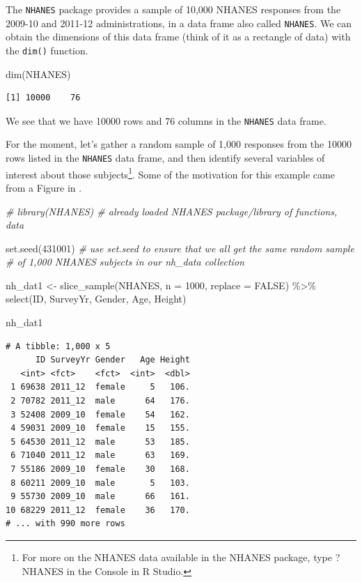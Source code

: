 \documentclass[
]{book}
\newenvironment{Shaded}{\begin{snugshade}}{\end{snugshade}}
\newcommand{\AttributeTok}[1]{\textcolor[rgb]{0.77,0.63,0.00}{#1}}
\newcommand{\CommentTok}[1]{\textcolor[rgb]{0.56,0.35,0.01}{\textit{#1}}}
\newcommand{\ConstantTok}[1]{\textcolor[rgb]{0.00,0.00,0.00}{#1}}
\newcommand{\DecValTok}[1]{\textcolor[rgb]{0.00,0.00,0.81}{#1}}
\newcommand{\FunctionTok}[1]{\textcolor[rgb]{0.00,0.00,0.00}{#1}}
\newcommand{\NormalTok}[1]{#1}
\newcommand{\OtherTok}[1]{\textcolor[rgb]{0.56,0.35,0.01}{#1}}
\newcommand{\SpecialCharTok}[1]{\textcolor[rgb]{0.00,0.00,0.00}{#1}}
\begin{document}
The \texttt{NHANES} package provides a sample of 10,000 NHANES responses from the 2009-10 and 2011-12 administrations, in a data frame also called \texttt{NHANES}. We can obtain the dimensions of this data frame (think of it as a rectangle of data) with the \texttt{dim()} function.

\begin{Shaded}
\begin{Highlighting}[]
\FunctionTok{dim}\NormalTok{(NHANES)}
\end{Highlighting}
\end{Shaded}

\begin{verbatim}
[1] 10000    76
\end{verbatim}

We see that we have 10000 rows and 76 columns in the \texttt{NHANES} data frame.

For the moment, let's gather a random sample of 1,000 responses from the 10000 rows listed in the \texttt{NHANES} data frame, and then identify several variables of interest about those subjects\footnote{For more on the NHANES data available in the NHANES package, type ?NHANES in the Console in R Studio.}. Some of the motivation for this example came from a Figure in \citet{BaumerKaplanHorton}.

\begin{Shaded}
\begin{Highlighting}[]
\CommentTok{\# library(NHANES) \# already loaded NHANES package/library of functions, data}

\FunctionTok{set.seed}\NormalTok{(}\DecValTok{431001}\NormalTok{) }
\CommentTok{\# use set.seed to ensure that we all get the same random sample }
\CommentTok{\# of 1,000 NHANES subjects in our nh\_data collection}

\NormalTok{nh\_dat1 }\OtherTok{\textless{}{-}} 
    \FunctionTok{slice\_sample}\NormalTok{(NHANES, }\AttributeTok{n =} \DecValTok{1000}\NormalTok{, }\AttributeTok{replace =} \ConstantTok{FALSE}\NormalTok{) }\SpecialCharTok{\%\textgreater{}\%}
    \FunctionTok{select}\NormalTok{(ID, SurveyYr, Gender, Age, Height)}

\NormalTok{nh\_dat1}
\end{Highlighting}
\end{Shaded}

\begin{verbatim}
# A tibble: 1,000 x 5
      ID SurveyYr Gender   Age Height
   <int> <fct>    <fct>  <int>  <dbl>
 1 69638 2011_12  female     5   106.
 2 70782 2011_12  male      64   176.
 3 52408 2009_10  female    54   162.
 4 59031 2009_10  female    15   155.
 5 64530 2011_12  male      53   185.
 6 71040 2011_12  male      63   169.
 7 55186 2009_10  female    30   168.
 8 60211 2009_10  male       5   103.
 9 55730 2009_10  male      66   161.
10 68229 2011_12  female    36   170.
# ... with 990 more rows
\end{verbatim}
\end{document}
